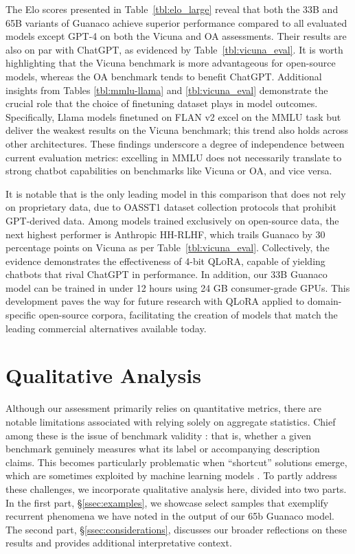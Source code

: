 The Elo scores presented in Table~\ref{tbl:elo_large} reveal that both the 33B and 65B variants of {Guanaco} achieve superior performance compared to all evaluated models except GPT-4 on both the Vicuna and OA assessments. Their results are also on par with ChatGPT, as evidenced by Table~\ref{tbl:vicuna_eval}. It is worth highlighting that the Vicuna benchmark is more advantageous for open-source models, whereas the OA benchmark tends to benefit ChatGPT. Additional insights from Tables \ref{tbl:mmlu-llama} and \ref{tbl:vicuna_eval} demonstrate the crucial role that the choice of finetuning dataset plays in model outcomes. Specifically, Llama models finetuned on FLAN v2 excel on the MMLU task but deliver the weakest results on the Vicuna benchmark; this trend also holds across other architectures. These findings underscore a degree of independence between current evaluation metrics: excelling in MMLU does not necessarily translate to strong chatbot capabilities on benchmarks like Vicuna or OA, and vice versa.

It is notable that  is the only leading model in this comparison that does not rely on proprietary data, due to OASST1 dataset collection protocols that prohibit GPT-derived data. Among models trained exclusively on open-source data, the next highest performer is Anthropic HH-RLHF, which trails {Guanaco} by 30 percentage points on Vicuna as per Table~\ref{tbl:vicuna_eval}. Collectively, the evidence demonstrates the effectiveness of 4-bit \textsc{QLoRA}, capable of yielding chatbots that rival ChatGPT in performance. In addition, our 33B {Guanaco} model can be trained in under 12 hours using 24 GB consumer-grade GPUs. This development paves the way for future research with \textsc{QLoRA} applied to domain-specific open-source corpora, facilitating the creation of models that match the leading commercial alternatives available today.

\section{Qualitative Analysis}

Although our assessment primarily relies on quantitative metrics, there are notable limitations associated with relying solely on aggregate statistics. Chief among these is the issue of benchmark validity \citep{liao2021we}: that is, whether a given benchmark genuinely measures what its label or accompanying description claims. This becomes particularly problematic when ``shortcut'' solutions emerge, which are sometimes exploited by machine learning models \citep{gururangan2018annotation, poliak2018hypothesis}. To partly address these challenges, we incorporate qualitative analysis here, divided into two parts. In the first part, \S\ref{ssec:examples}, we showcase select samples that exemplify recurrent phenomena we have noted in the output of our 65b {Guanaco} model. The second part, \S\ref{ssec:considerations}, discusses our broader reflections on these results and provides additional interpretative context.


